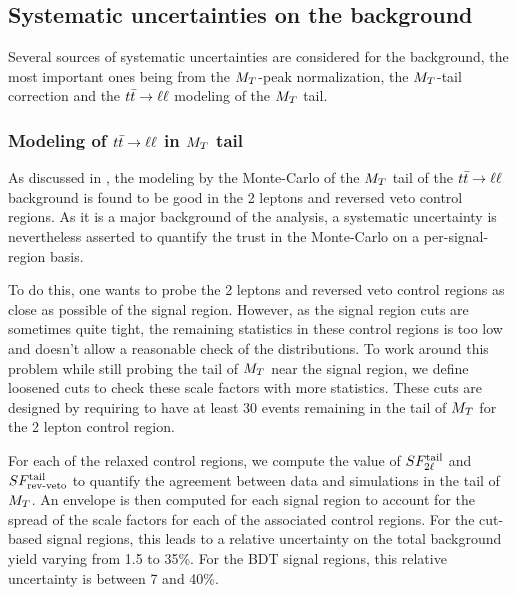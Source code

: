     \subsection{Systematic uncertainties on the background \label{sec:background_systematics}}

    Several sources of systematic uncertainties are considered for the
    background, the most important ones being from the $M_T$-peak normalization,
    the $M_T$-tail correction and the $t\bar{t} \rightarrow \ell \ell$ modeling of the $M_T$ tail.

    \subsubsection{Modeling of $t\bar{t} \rightarrow \ell \ell$ in $M_T$ tail}

    As discussed in , the modeling
    by the Monte-Carlo of the $M_T$ tail of the $t\bar{t} \rightarrow \ell \ell$ background is
    found to be good in the 2 leptons and reversed veto control regions. As it
    is a major background of the analysis, a systematic uncertainty is
    nevertheless asserted to quantify the trust in the Monte-Carlo on a
    per-signal-region basis.

    To do this, one wants to probe the 2 leptons and reversed veto control
    regions as close as possible of the signal region. However, as the signal
    region cuts are sometimes quite tight, the remaining statistics in these
    control regions is too low and doesn't allow a reasonable check of the
    distributions. To work around this problem while still probing the tail of
    $M_T$ near the signal region, we define loosened cuts to check these scale
    factors with more statistics. These cuts are designed by requiring to have
    at least 30 events remaining in the tail of $M_T$ for the 2 lepton control
    region.

    For each of the relaxed control regions, we compute the value of
    $SF_{2\ell}^{\text{tail}}$ and $SF_{\text{rev-veto}}^{\text{tail}}$ to quantify the agreement between data and
    simulations in the tail of $M_T$. An envelope is then computed for each
    signal region to account for the spread of the scale factors for each of the
    associated control regions. For the cut-based signal regions, this leads to
    a relative uncertainty on the total background yield varying from 1.5 to
    35\%. For the BDT signal regions, this relative uncertainty is between 7 and
    40\%.

